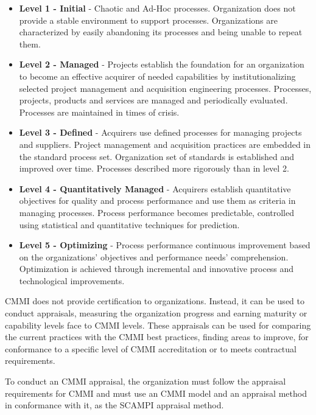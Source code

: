 \begin{itemize}

\item \textbf{Level 1 - Initial} - Chaotic and Ad-Hoc processes. Organization does not provide a stable environment to support processes. Organizations are characterized by easily abandoning its processes and being unable to repeat them.

\item \textbf{Level 2 - Managed} - Projects establish the foundation for an organization to become an effective acquirer of needed capabilities by institutionalizing selected project management and acquisition engineering processes. Processes, projects, products and services are managed and periodically evaluated. Processes are maintained in times of crisis.

\item \textbf{Level 3 - Defined} - Acquirers use defined processes for managing projects and suppliers. Project management and acquisition practices are embedded in the standard process set. Organization set of standards is established and improved over time. Processes described more rigorously than in level 2.

\item \textbf{Level 4 - Quantitatively Managed} - Acquirers establish quantitative objectives for quality and process performance and use them as criteria in managing processes. Process performance becomes predictable, controlled using statistical and quantitative techniques for prediction.

\item \textbf{Level 5 - Optimizing} - Process performance continuous improvement based on the organizations' objectives and performance needs' comprehension. Optimization is achieved through incremental and innovative process and technological improvements.

\end{itemize}

CMMI does not provide certification to organizations. Instead, it can be used to conduct appraisals, measuring the organization progress and earning maturity or capability levels face to CMMI levels. These appraisals can be used for comparing the current practices with the CMMI best practices, finding areas to improve, for conformance to a specific level of CMMI accreditation or to meets contractual requirements.\par
To conduct an CMMI appraisal, the organization must follow the appraisal requirements for CMMI \cite{appraisalReqs} and must use an CMMI model and an appraisal method in conformance with it, as the SCAMPI appraisal method\cite{Scampi}.\par


